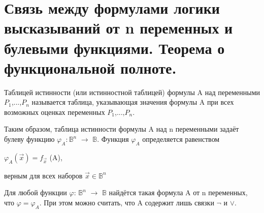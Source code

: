 \section{Связь между формулами логики высказываний от n переменных и булевыми функциями. Теорема о функциональной
полноте.}

\begin{definition}
	Таблицей истинности (или истинностной таблицей) формулы A над переменными $P_1$,...,$P_n$ называется таблица,
	указывающая значения формулы A при всех возможных оценках переменных $P_1$,...,$P_n$.

	Таким образом, таблица истинности формулы A над n переменными задаёт булеву функцию $\varphi_A : \mathbb{B}^n$
	$\to$ $\mathbb{B}$. Функция $\varphi_A$ определяется равенством
	\begin{center}
		$\varphi_A (\vec{x}) = f_{\vec{x}}$ (A),
	\end{center}
	верным для всех наборов $\vec{x} \in \mathbb{B}^n$
\end{definition}

\begin{theorem}
	Для любой функции $\varphi$: $\mathbb{B}^n$ $\to$ $\mathbb{B}$ найдётся такая формула A от n переменных, что
	$\varphi = \varphi_A$. При этом можно считать, что A содержит лишь связки $\neg$ и $\lor$.
\end{theorem}

